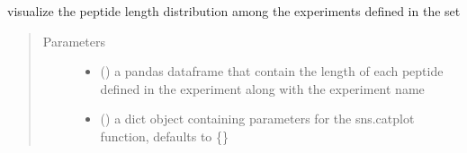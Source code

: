 \documentclass[letterpaper,10pt,english]{sphinxmanual}
\begin{document}
\begin{fulllineitems}
\label{\detokenize{IPTK.Visualization:IPTK.Visualization.vizTools.plot_peptide_length_per_experiment}}
visualize the peptide length distribution among the experiments defined in the set
\begin{quote}\begin{description}
\item[{Parameters}] \leavevmode\begin{itemize}
\item {} 
 () \textendash{} a pandas dataframe that contain the length of each peptide defined in the experiment along with     the experiment name

\item {} 
 (\sphinxstyleliteralemphasis{\sphinxupquote{{[}}}\sphinxstyleliteralemphasis{\sphinxupquote{,}}\sphinxstyleliteralemphasis{\sphinxupquote{{]}}}\sphinxstyleliteralemphasis{\sphinxupquote{, }}) \textendash{} a dict object containing parameters for the sns.catplot function, defaults to \{\}

\end{itemize}

\end{description}\end{quote}

\end{fulllineitems}

\end{document}
